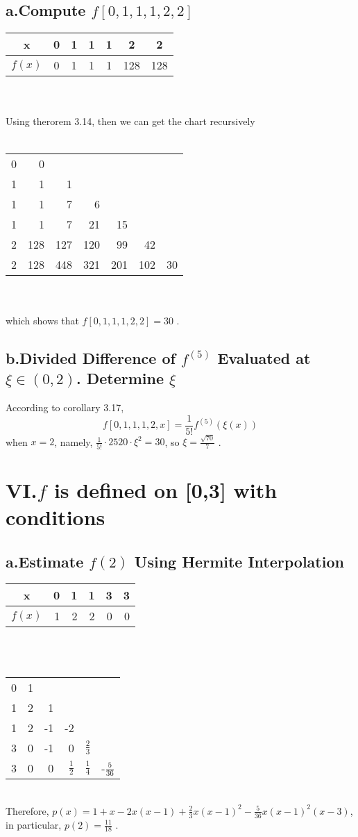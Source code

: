 \documentclass[twoside,a4paper,12pt]{article}
\begin{document}
\subsection*{a.Compute $f[0,1,1,1,2,2]$}
\begin{tabular}{c|cccccc}
x&0&1&1&1&2&2\\
\hline
$f(x)$&0&1&1&1 &128& 128\\

\end{tabular}
\\
\\
Using therorem 3.14, then we can get the chart recursively\\ 
\\
\begin{tabular}{c|rrrrrr}
0 & 0\\
1 & 1 & 1\\
1 & 1 &7 & 6\\
1&1&7&21&15\\
2&128&127&120&99&42&\\
2&128&448&321&201&102&30\\
\end{tabular}
\\
\\
which shows that $f[0,1,1,1,2,2] = 30$ .
\subsection*{b.Divided Difference of $f^{(5)}$ Evaluated at $\xi\in(0,2)$. Determine $\xi$}
According to corollary 3.17,
\[
f[0,1,1,1,2,x]=\frac{1}{5!}f^{(5)}(\xi(x))
\]
when $x=2$, namely, $\frac{1}{5!}\cdot2520\cdot\xi^2=30$, so $\xi=\frac{\sqrt{70}}{7}$ .
\section*{VI.$f$ is defined on [0,3] with conditions}
\subsection*{a.Estimate $f(2)$ Using Hermite Interpolation}
\begin{tabular}{c|rrrrr}
x & 0 & 1 & 1 & 3 & 3\\
\hline
$f(x)$& 1 & 2 & 2&0&0\\
\end{tabular}
\\
\\
\begin{tabular}{c|rrrrr}
0& 1\\
1& 2& 1\\
1& 2& -1& -2\\
3& 0& -1& 0& $\frac{2}{3}$\\
3& 0& 0& $\frac{1}{2}$ &$\frac{1}{4}$ &-$\frac{5}{36}$\\
\end{tabular}
\\
Therefore, $p(x)=1+x-2x(x-1)+\frac{2}{3}x(x-1)^2-\frac{5}{36}x(x-1)^2(x-3)$, in particular, $p(2)=\frac{11}{18}$ .
\end{document}
